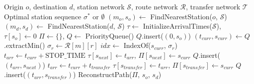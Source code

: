 \begin{algorithm}
\caption{Multi-Modal Public Transport Route Discovery}
\label{alg:multimodal-routing}
\begin{algorithmic}[1]
\Require Origin $o$, destination $d$, station network $\mathcal{S}$, route network $\mathcal{R}$, transfer network $\mathcal{T}$
\Ensure Optimal station sequence $\sigma^*$ or $\emptyset$
\State $(m_o, s_o) \gets$ FindNearestStation($o$, $\mathcal{S}$)
\State $(m_d, s_d) \gets$ FindNearestStation($d$, $\mathcal{S}$)
\State $\tau \gets$ InitializeArrivalTimes($\mathcal{S}$), $\tau[s_o] \gets 0$
\State $\Pi \gets \{\}$, $Q \gets$ PriorityQueue()
\State $Q$.insert($(0, s_o)$)
    \State $(t_{curr}, s_{curr}) \gets Q$.extractMin()
            \State $\sigma_r \gets \mathcal{R}[m][r]$
            \State $idx \gets$ IndexOf($s_{curr}$, $\sigma_r$)
                \State $t_{arr} \gets t_{curr} + \text{STOP\_TIME}$
                    \State $\tau[s_{next}] \gets t_{arr}$, $\Pi[s_{next}] \gets s_{curr}$
                    \State $Q$.insert($(t_{arr}, s_{next})$)
                \EndIf
            \EndFor
        \EndFor
    \EndFor
        \State $t_{arr} \gets t_{curr} + t_{transfer}$
            \State $\tau[s_{transfer}] \gets t_{arr}$, $\Pi[s_{transfer}] \gets s_{curr}$
            \State $Q$.insert($(t_{arr}, s_{transfer})$)
        \EndIf
    \EndFor
\EndWhile
\State \Return ReconstructPath($\Pi$, $s_o$, $s_d$)
\end{algorithmic}
\end{algorithm}

